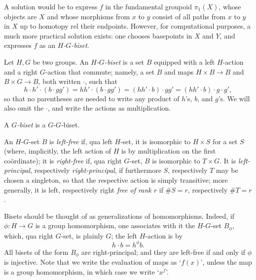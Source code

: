 \documentclass{amsart}
\begin{document}
A solution would be to express $f$ in the fundamental groupoid
$\pi_1(X)$, whose objects are $X$ and whose morphisms from $x$ to $y$
consist of all paths from $x$ to $y$ in $X$ up to homotopy rel their
endpoints. However, for computational purposes, a much more practical
solution exists: one chooses basepoints in $X$ and $Y$, and expresses
$f$ as an \emph{$H$-$G$-biset}.

\begin{defn}[Bisets]
  Let $H,G$ be two groups. An \emph{$H$-$G$-biset} is a set $B$ equipped
  with a left $H$-action and a right $G$-action that commute; namely,
  a set $B$ and maps $H\times B\to B$ and $B\times G\to B$, both
  written $\cdot$, such that
  \[h\cdot h'\cdot (b\cdot g g')=h h'\cdot(b\cdot g g')=(h h'\cdot b)\cdot g g'=(h h'\cdot b)\cdot g\cdot g',
  \]
  so that no parentheses are needed to write any product of $h$'s, $b$,
  and $g$'s. We will also omit the $\cdot$, and write the actions as
  multiplication.

  A \emph{$G$-biset} is a $G$-$G$-biset.

  An $H$-$G$-set $B$ is \emph{left-free} if, qua left $H$-set, it is
  isomorphic to $H\times S$ for a set $S$ (where, implicitly, the left
  action of $H$ is by multiplication on the first co\"ordinate); it is
  \emph{right-free} if, qua right $G$-set, $B$ is isomorphic to
  $T\times G$. It is \emph{left-principal}, respectively
  \emph{right-principal}, if furthermore $S$, respectively $T$ may be
  chosen a singleton, so that the respective action is simply
  transitive; more generally, it is left, respectively right
  \emph{free of rank $r$} if $\#S=r$, respectively $\#T=r$.
\end{defn}

Bisets should be thought of as generalizations of
homomorphisms. Indeed, if $\phi\colon H\to G$ is a group homomorphism, one
associates with it the $H$-$G$-set $B_\phi$, which, qua right $G$-set,
is plainly $G$; the left $H$-action is by
\[h\cdot b=h^\phi b.
\]
All bisets of the form $B_\phi$ are right-principal; and they are
left-free if and only if $\phi$ is injective. Note that we write the
evaluation of maps as `$f(x)$', unless the map is a group
homomorphism, in which case we write `$x^f$'.
\end{document}
